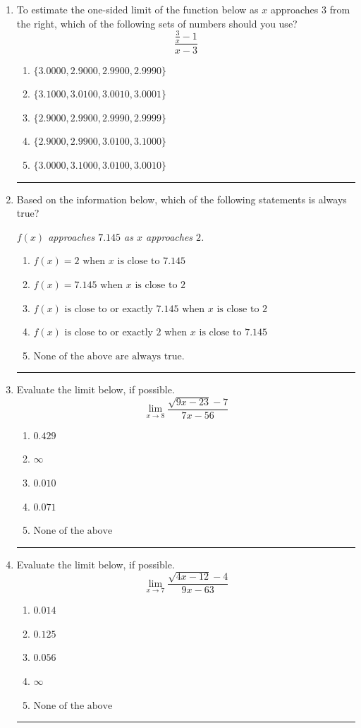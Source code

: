 \documentclass[14pt]{extbook}
\newcommand{\litem}[1]{\item#1\hspace*{-1cm}\rule{\textwidth}{0.4pt}}
\begin{document}
\begin{enumerate}
{\begin{enumerate}[label=\Alph*.]
\end{enumerate} }
\litem{
To estimate the one-sided limit of the function below as $x$ approaches 3 from the right, which of the following sets of numbers should you use?\[ \frac{\frac{3}{x} - 1}{x - 3} \]\begin{enumerate}[label=\Alph*.]
\item \( \{ 3.0000, 2.9000, 2.9900, 2.9990 \} \)
\item \( \{ 3.1000, 3.0100, 3.0010, 3.0001 \} \)
\item \( \{ 2.9000, 2.9900, 2.9990, 2.9999 \} \)
\item \( \{ 2.9000, 2.9900, 3.0100, 3.1000 \} \)
\item \( \{ 3.0000, 3.1000, 3.0100, 3.0010 \} \)

\end{enumerate} }
\litem{
Based on the information below, which of the following statements is always true?
\begin{center}
    \textit{ $f(x)$ approaches $7.145$ as $x$ approaches $2$. }
\end{center}
\begin{enumerate}[label=\Alph*.]
\item \( f(x) = 2 \text{ when } x \text{ is close to } 7.145 \)
\item \( f(x) = 7.145 \text{ when } x \text{ is close to } 2 \)
\item \( f(x) \text{ is close to or exactly } 7.145 \text{ when } x \text{ is close to } 2 \)
\item \( f(x) \text{ is close to or exactly } 2 \text{ when } x \text{ is close to } 7.145 \)
\item \( \text{None of the above are always true.} \)

\end{enumerate} }
\litem{
Evaluate the limit below, if possible.\[ \lim_{x \rightarrow 8} \frac{\sqrt{9x - 23} - 7}{7x - 56} \]\begin{enumerate}[label=\Alph*.]
\item \( 0.429 \)
\item \( \infty \)
\item \( 0.010 \)
\item \( 0.071 \)
\item \( \text{None of the above} \)

\end{enumerate} }
\litem{
Evaluate the limit below, if possible.\[ \lim_{x \rightarrow 7} \frac{\sqrt{4x - 12} - 4}{9x - 63} \]\begin{enumerate}[label=\Alph*.]
\item \( 0.014 \)
\item \( 0.125 \)
\item \( 0.056 \)
\item \( \infty \)
\item \( \text{None of the above} \)

\end{enumerate} }
\end{enumerate}
\end{document}
